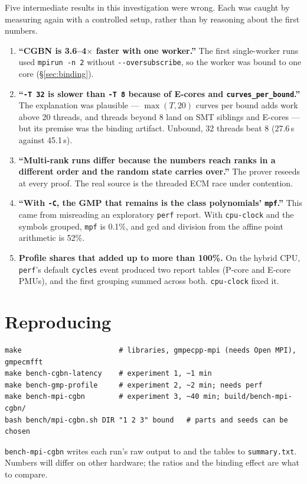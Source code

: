 \documentclass[11pt,a4paper]{article}
\newcommand{\code}[1]{\texttt{#1}}
\begin{document}
Five intermediate results in this investigation were wrong. Each was caught
by measuring again with a controlled setup, rather than by reasoning about
the first numbers.
\begin{enumerate}
  \item \textbf{``CGBN is 3.6--4$\times$ faster with one worker.''} The
    first single-worker runs used \code{mpirun -n 2} without
    \code{-{}-oversubscribe}, so the worker was bound to one core
    (\S\ref{sec:binding}).
  \item \textbf{``\code{-T 32} is slower than \code{-T 8} because of
    E-cores and \code{curves\_per\_bound}.''} The explanation was plausible
    --- $\max(T, 20)$ curves per bound adds work above 20 threads, and
    threads beyond 8 land on SMT siblings and E-cores --- but its premise
    was the binding artifact. Unbound, 32 threads beat 8 (27.6\,s against
    45.1\,s).
  \item \textbf{``Multi-rank runs differ because the numbers reach ranks in
    a different order and the random state carries over.''} The prover
    reseeds at every proof. The real source is the threaded ECM race under
    contention.
  \item \textbf{``With \code{-C}, the GMP that remains is the class
    polynomials' \code{mpf}.''} This came from misreading an exploratory
    \code{perf} report. With \code{cpu-clock} and the symbols grouped,
    \code{mpf} is 0.1\%, and gcd and division from the affine point
    arithmetic is 52\%.
  \item \textbf{Profile shares that added up to more than 100\%.} On the
    hybrid CPU, \code{perf}'s default \code{cycles} event produced two report
    tables (P-core and E-core PMUs), and the first grouping summed across
    both. \code{cpu-clock} fixed it.
\end{enumerate}

\section{Reproducing}

\begin{lstlisting}
make                       # libraries, gmpecpp-mpi (needs Open MPI), gmpecmfft
make bench-cgbn-latency    # experiment 1, ~1 min
make bench-gmp-profile     # experiment 2, ~2 min; needs perf
make bench-mpi-cgbn        # experiment 3, ~40 min; build/bench-mpi-cgbn/
bash bench/mpi-cgbn.sh DIR "1 2 3" bound   # parts and seeds can be chosen
\end{lstlisting}
\code{bench-mpi-cgbn} writes each run's raw output to
 and the
tables to \code{summary.txt}. Numbers will differ on other hardware; the ratios
and the binding effect are what to compare.
\end{document}
